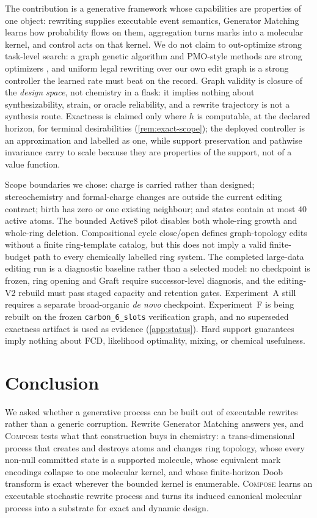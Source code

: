 \documentclass{article}
\newcommand{\method}{\textsc{Compose}\xspace}
\theoremstyle{definition}
\theoremstyle{remark}
\begin{document}
The contribution is a generative framework whose capabilities are properties of one object: rewriting supplies executable event semantics, Generator Matching learns how probability flows on them, aggregation turns marks into a molecular kernel, and control acts on that kernel. We do not claim to out-optimize strong task-level search: a graph genetic algorithm and PMO-style methods are strong optimizers \citep{jensen2019graphga,gao2022pmo}, and uniform legal rewriting over our own edit graph is a strong controller the learned rate must beat on the record. Graph validity is closure of the \emph{design space}, not chemistry in a flask: it implies nothing about synthesizability, strain, or oracle reliability, and a rewrite trajectory is not a synthesis route. Exactness is claimed only where $h$ is computable, at the declared horizon, for terminal desirabilities (\cref{rem:exact-scope}); the deployed controller is an approximation and labelled as one, while support preservation and pathwise invariance carry to scale because they are properties of the support, not of a value function.

Scope boundaries we chose: charge is carried rather than designed; stereochemistry and formal-charge changes are outside the current editing contract; birth has zero or one existing neighbour; and states contain at most $40$ active atoms. The bounded Active8 pilot disables both whole-ring growth and whole-ring deletion. Compositional cycle close/open defines graph-topology edits without a finite ring-template catalog, but this does not imply a valid finite-budget path to every chemically labelled ring system. The completed large-data editing run is a diagnostic baseline rather than a selected model: no checkpoint is frozen, ring opening and Graft require successor-level diagnosis, and the editing-V2 rebuild must pass staged capacity and retention gates. Experiment~A still requires a separate broad-organic \emph{de novo} checkpoint. Experiment~F is being rebuilt on the frozen \texttt{carbon\_6\_slots} verification graph, and no superseded exactness artifact is used as evidence (\cref{app:status}). Hard support guarantees imply nothing about FCD, likelihood optimality, mixing, or chemical usefulness.

\section{Conclusion}

We asked whether a generative process can be built out of executable rewrites rather than a generic corruption. Rewrite Generator Matching answers yes, and \method tests what that construction buys in chemistry: a trans-dimensional process that creates and destroys atoms and changes ring topology, whose every non-null committed state is a supported molecule, whose equivalent mark encodings collapse to one molecular kernel, and whose finite-horizon Doob transform is exact wherever the bounded kernel is enumerable. \method learns an executable stochastic rewrite process and turns its induced canonical molecular process into a substrate for exact and dynamic design.
\end{document}
